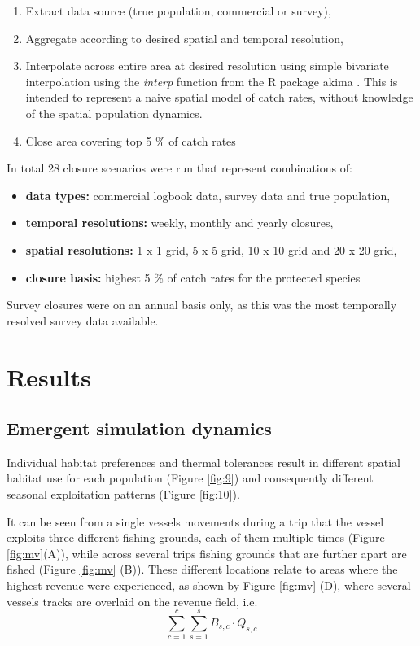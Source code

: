 \documentclass[review]{elsarticle}
\begin{document}
\begin{enumerate}
	\item Extract data source (true population, commercial or survey), 
	\item Aggregate according to desired spatial and temporal resolution,
	\item Interpolate across entire area at desired resolution using simple
		bivariate interpolation using the \emph{interp} function from
		the R package akima \citep{Akima2006}. This is intended to
		represent a naive spatial model of catch rates, without
		knowledge of the spatial population dynamics.
	\item Close area covering top 5 \% of catch rates 
\end{enumerate}
In total 28 closure scenarios were run that represent combinations of:

\begin{itemize}
	\item \textbf{data types:} commercial logbook data, survey data and
		true population,
	\item \textbf{temporal resolutions:} weekly, monthly and yearly
		closures,
	\item \textbf{spatial resolutions:} 1 x 1 grid, 5 x 5 grid, 10 x 10
		grid and 20 x 20 grid,
	\item \textbf{closure basis:} highest 5 \%  of catch rates for the
		protected species
\end{itemize}

Survey closures were on an annual basis only, as this was the most temporally
resolved survey data available.

\section{Results}

\subsection{Emergent simulation dynamics}

Individual habitat preferences and thermal tolerances result in different
spatial habitat use for each population (Figure \ref{fig:9}) and consequently
different seasonal exploitation patterns (Figure \ref{fig:10}). 

It can be seen from a single vessels movements during a trip that the vessel
exploits three different fishing grounds, each of them multiple times (Figure
\ref{fig:mv}(A)), while across several trips fishing grounds that are further
apart are fished (Figure \ref{fig:mv} (B)). These different locations relate to
areas where the highest revenue were experienced, as shown by Figure
\ref{fig:mv} (D), where several vessels tracks are overlaid on the revenue
field, i.e. $$\sum^c_{c=1}\sum^s_{s=1} B_{s,c} \cdot Q_{s,c}$$
\end{document}
